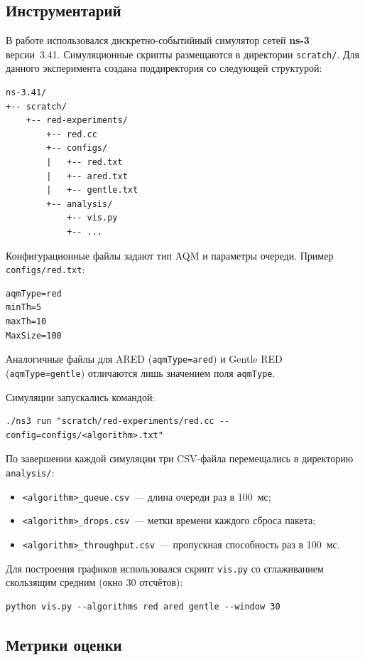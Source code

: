 \documentclass[12pt,a4paper]{article}
\begin{document}
\subsection{Инструментарий}

В работе использовался дискретно-событийный симулятор сетей \textbf{ns-3} версии~3.41. Симуляционные скрипты размещаются в директории \texttt{scratch/}. Для данного эксперимента создана поддиректория со следующей структурой:

\begin{verbatim}
ns-3.41/
+-- scratch/
    +-- red-experiments/
        +-- red.cc
        +-- configs/
        |   +-- red.txt
        |   +-- ared.txt
        |   +-- gentle.txt
        +-- analysis/
            +-- vis.py
            +-- ...
\end{verbatim}

Конфигурационные файлы задают тип AQM и параметры очереди. Пример \texttt{configs/red.txt}:

\begin{lstlisting}
aqmType=red
minTh=5
maxTh=10
MaxSize=100
\end{lstlisting}

Аналогичные файлы для ARED (\texttt{aqmType=ared}) и Gentle RED (\texttt{aqmType=gentle}) отличаются лишь значением поля \texttt{aqmType}.

Симуляции запускались командой:
\begin{lstlisting}
./ns3 run "scratch/red-experiments/red.cc --config=configs/<algorithm>.txt"
\end{lstlisting}

По завершении каждой симуляции три CSV-файла перемещались в директорию \texttt{analysis/}:
\begin{itemize}
  \item \texttt{<algorithm>\_queue.csv}~--- длина очереди раз в 100~мс;
  \item \texttt{<algorithm>\_drops.csv}~--- метки времени каждого сброса пакета;
  \item \texttt{<algorithm>\_throughput.csv}~--- пропускная способность раз в 100~мс.
\end{itemize}

Для построения графиков использовался скрипт \texttt{vis.py} со сглаживанием скользящим средним (окно 30 отсчётов):
\begin{lstlisting}
python vis.py --algorithms red ared gentle --window 30
\end{lstlisting}

\subsection{Метрики оценки}
\end{document}
